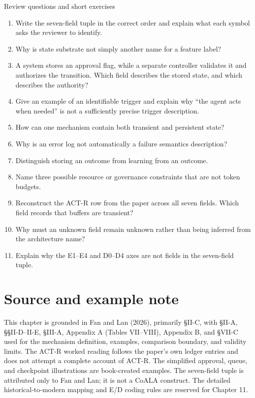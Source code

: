 \begin{reviewquestions}{Review questions and short exercises}
\begin{enumerate}
  \item Write the seven-field tuple in the correct order and explain what each symbol asks the reviewer to identify.
  \item Why is state substrate not simply another name for a feature label?
  \item A system stores an approval flag, while a separate controller validates it and authorizes the transition. Which field describes the stored state, and which describes the authority?
  \item Give an example of an identifiable trigger and explain why ``the agent acts when needed'' is not a sufficiently precise trigger description.
  \item How can one mechanism contain both transient and persistent state?
  \item Why is an error log not automatically a failure semantics description?
  \item Distinguish storing an outcome from learning from an outcome.
  \item Name three possible resource or governance constraints that are not token budgets.
  \item Reconstruct the ACT-R row from the paper across all seven fields. Which field records that buffers are transient?
  \item Why must an unknown field remain unknown rather than being inferred from the architecture name?
  \item Explain why the E1--E4 and D0--D4 axes are not fields in the seven-field tuple.
\end{enumerate}
\end{reviewquestions}

\section*{Source and example note}
This chapter is grounded in Fan and Lan (2026), primarily §II-C, with §II-A, §§II-D--II-E, §III-A, Appendix A (Tables VII--VIII), Appendix B, and §VII-C used for the mechanism definition, examples, comparison boundary, and validity limits. The ACT-R worked reading follows the paper's own ledger entries and does not attempt a complete account of ACT-R. The simplified approval, queue, and checkpoint illustrations are book-created examples. The seven-field tuple is attributed only to Fan and Lan; it is not a CoALA construct. The detailed historical-to-modern mapping and E/D coding rules are reserved for Chapter 11.

